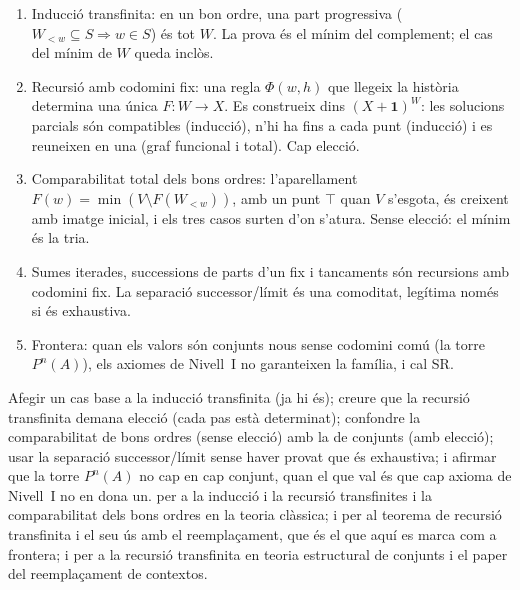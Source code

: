 \begin{resumcap}
\begin{enumerate}
  \item Inducció transfinita: en un bon ordre, una part progressiva (\(W_{<w}\subseteq S\Rightarrow w\in S\)) és tot \(W\). La prova és el mínim del complement; el cas del mínim de \(W\) queda inclòs.
  \item Recursió amb codomini fix: una regla \(\Phi(w,h)\) que llegeix la història determina una única \(F\colon W\to X\). Es construeix dins \((X+\mathbf1)^W\): les solucions parcials són compatibles (inducció), n'hi ha fins a cada punt (inducció) i es reuneixen en una (graf funcional i total). Cap elecció.
  \item Comparabilitat total dels bons ordres: l'aparellament \(F(w)=\min(V\setminus F(W_{<w}))\), amb un punt \(\top\) quan \(V\) s'esgota, és creixent amb imatge inicial, i els tres casos surten d'on s'atura. Sense elecció: el mínim és la tria.
  \item Sumes iterades, successions de parts d'un fix i tancaments són recursions amb codomini fix. La separació successor/límit és una comoditat, legítima només si és exhaustiva.
  \item Frontera: quan els valors són conjunts nous sense codomini comú (la torre \(P^n(A)\)), els axiomes de Nivell~I no garanteixen la família, i cal SR.
\end{enumerate}
 Afegir un cas base a la inducció transfinita (ja hi és); creure que la recursió transfinita demana elecció (cada pas està determinat); confondre la comparabilitat de bons ordres (sense elecció) amb la de conjunts (amb elecció); usar la separació successor/límit sense haver provat que és exhaustiva; i afirmar que la torre \(P^n(A)\) no cap en cap conjunt, quan el que val és que cap axioma de Nivell~I no en dona un.
 \cite[§§17--18]{halmos} per a la inducció i la recursió transfinites i la comparabilitat dels bons ordres en la teoria clàssica; \cite[cap.~2]{jech2003} i \cite[cap.~I.9]{kunen2011} per al teorema de recursió transfinita i el seu ús amb el reemplaçament, que és el que aquí es marca com a frontera; i \cite[§§3--4]{shulman-comparing} per a la recursió transfinita en teoria estructural de conjunts i el paper del reemplaçament de contextos.
\end{resumcap}
